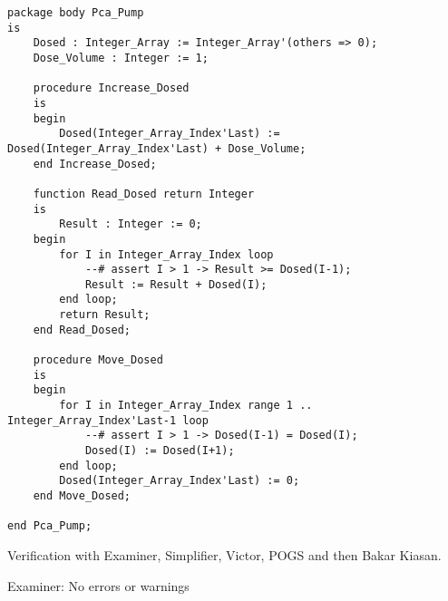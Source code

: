 \begin{lstlisting}
package body Pca_Pump
is
    Dosed : Integer_Array := Integer_Array'(others => 0);
    Dose_Volume : Integer := 1;

    procedure Increase_Dosed
    is
    begin
        Dosed(Integer_Array_Index'Last) := Dosed(Integer_Array_Index'Last) + Dose_Volume;
    end Increase_Dosed;

    function Read_Dosed return Integer
    is
        Result : Integer := 0;
    begin
        for I in Integer_Array_Index loop
            --# assert I > 1 -> Result >= Dosed(I-1);
            Result := Result + Dosed(I);
        end loop;
        return Result;
    end Read_Dosed;

    procedure Move_Dosed
    is
    begin
        for I in Integer_Array_Index range 1 .. Integer_Array_Index'Last-1 loop
            --# assert I > 1 -> Dosed(I-1) = Dosed(I);
            Dosed(I) := Dosed(I+1);
        end loop;
        Dosed(Integer_Array_Index'Last) := 0;
    end Move_Dosed;

end Pca_Pump;

\end{lstlisting}


Verification with Examiner, Simplifier, Victor, POGS and then Bakar Kiasan.

Examiner:
No errors or warnings

